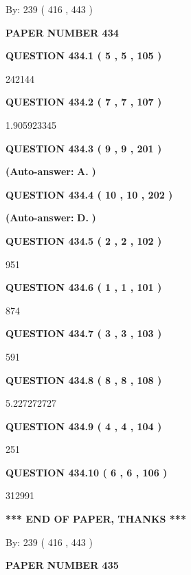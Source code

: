 \documentclass{ctexart}
\begin{document}
   
\hspace{1.0in} By: 
 239 ( 416 ,  443 )
   
   
   
   
\newpage 
\setcounter{page}{ 
   434001 } 
   
   
 {\textbf{ \Large{ PAPER NUMBER  434  }}}
   
   
   
   
  
  
{\textbf{\large{QUESTION
434.1 
 ( 5 , 5 , 105 )
}}}

242144
  
  
{\textbf{\large{QUESTION
434.2 
 ( 7 , 7 , 107 )
}}}

1.905923345
  
  
{\textbf{\large{QUESTION
434.3 
 ( 9 , 9 , 201 )
}}}
 
 
{\textbf{(Auto-answer:}}
{\textbf{\large{
A.}}}
{\textbf{)}}
 
 
  
  
{\textbf{\large{QUESTION
434.4 
 ( 10 , 10 , 202 )
}}}
 
 
{\textbf{(Auto-answer:}}
{\textbf{\large{
D.}}}
{\textbf{)}}
 
 
  
  
{\textbf{\large{QUESTION
434.5 
 ( 2 , 2 , 102 )
}}}

951
  
  
{\textbf{\large{QUESTION
434.6 
 ( 1 , 1 , 101 )
}}}

874
  
  
{\textbf{\large{QUESTION
434.7 
 ( 3 , 3 , 103 )
}}}

591
  
  
{\textbf{\large{QUESTION
434.8 
 ( 8 , 8 , 108 )
}}}

5.227272727
  
  
{\textbf{\large{QUESTION
434.9 
 ( 4 , 4 , 104 )
}}}

251
  
  
{\textbf{\large{QUESTION
434.10 
 ( 6 , 6 , 106 )
}}}

312991
   
   
   
   
\vspace{1.0in} 
{\textbf{\large{ *** END OF PAPER, THANKS *** }}} 
   
   
\hspace{1.0in} By: 
 239 ( 416 ,  443 )
   
   
   
   
\newpage 
\setcounter{page}{ 
   435001 } 
   
   
 {\textbf{ \Large{ PAPER NUMBER  435  }}}
   
\end{document}
